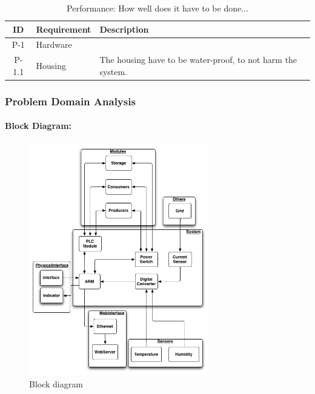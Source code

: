 		\begin{table}[h!]
			\begin{tabular} [b] {| c | p{3cm} | p{10cm} |}
			\hline
			\textbf{ID} & \textbf{Requirement} & \textbf{Description} \\\hline
			P-1 & Hardware 		&  \\ \hline
			P-1.1 & Housing 		& The housing have to be water-proof, to not harm the system.\\ \hline
		\end{tabular}
		\caption{Performance: How well does it have to be done...}
		\end{table}
	\subsubsection{Problem Domain Analysis}
			\paragraph{Block Diagram:}
			\begin{figure}[h!]		%
				\begin{centering}
					 \includegraphics[width=0.7\textwidth]{images/block_diagram.png}
		 			\caption{Block diagram}
			 	\end{centering}
			\end{figure}
			

